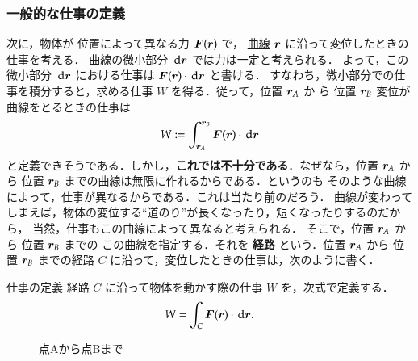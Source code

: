         \subsubsection{一般的な仕事の定義}
                次に，物体が 位置によって異なる力 $\boldsymbol{F}(\boldsymbol{r})$ で，
                \underline{曲線} $\boldsymbol{r}$ に沿って変位したときの仕事を考える．
                曲線の微小部分 $\,\mathrm{d}\boldsymbol{r}$ では力は一定と考えられる．
                よって，この微小部分 $\,\mathrm{d}\boldsymbol{r}$ における仕事は
                $\boldsymbol{F}(\boldsymbol{r}) \cdot \,\mathrm{d}\boldsymbol{r}$ と書ける．
                すなわち，微小部分での仕事を積分すると，求める仕事 $W$ を得る．従って，位置 $\boldsymbol{r}_{A}$ か
                ら 位置 $\boldsymbol{r}_{B}$
                変位が曲線をとるときの仕事は
                    \begin{align}
                        W:=\int_{\boldsymbol{r}_{A}}^{\boldsymbol{r}_{B}}
                        \boldsymbol{F}(\boldsymbol{r}) \cdot \,\mathrm{d}\boldsymbol{r}
                    \end{align}
                と定義できそうである．しかし，\textbf{これでは不十分である}．なぜなら，位置 $\boldsymbol{r}_{A}$ から
                位置 $\boldsymbol{r}_{B}$ までの曲線は無限に作れるからである．というのも
                そのような曲線によって，仕事が異なるからである．これは当たり前のだろう．
                曲線が変わってしまえば，物体の変位する“道のり”が長くなったり，短くなったりするのだから，
                当然，仕事もこの曲線によって異なると考えられる．
                そこで，位置 $\boldsymbol{r}_{A}$ から
                位置 $\boldsymbol{r}_{B}$ までの
                この曲線を指定する．それを \textbf{経路} という．位置 $\boldsymbol{r}_{A}$ から
                位置 $\boldsymbol{r}_{B}$ までの経路 $C$ に沿って，変位したときの仕事は，次のように書く．
                        \begin{myshadebox}{仕事の定義}
                            経路 $C$ に沿って物体を動かす際の仕事 $W$ を，次式で定義する．
                            \begin{align}
                                W=\int_{C}\boldsymbol{F}(\boldsymbol{r}) \cdot \,\mathrm{d}\boldsymbol{r}.
                            \end{align}
                        \end{myshadebox}
                    \begin{figure}[hbt]
                            \begin{center}
                                \caption{点Aから点Bまで}
                                \label{fig:sigoto_keiro1}
                            \end{center}
                    \end{figure}


